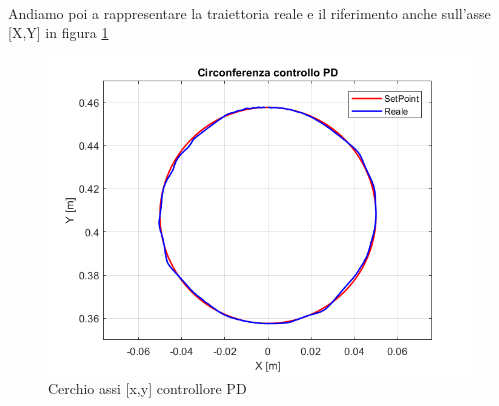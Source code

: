 \\Andiamo poi a rappresentare la traiettoria reale e il riferimento anche sull'asse [X,Y] in figura \ref{fig:PDBracciaC}
\begin{figure}[ht]
	\begin{center}
		\includegraphics[scale=0.42]{Immagini/Traiettorie/Cerchio}
		\caption{Cerchio assi  [x,y] controllore PD}
		\label{fig:PDBracciaC}
	\end{center}
\end{figure}
